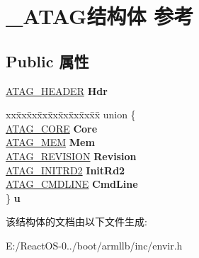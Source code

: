 \hypertarget{struct___a_t_a_g}{}\section{\+\_\+\+A\+T\+A\+G结构体 参考}
\label{struct___a_t_a_g}
\subsection*{Public 属性}
\begin{DoxyCompactItemize}
\item 
\mbox{\label{struct___a_t_a_g_ab2f69b82694a96cf59af987ccbd45232}} 
\hyperlink{struct___a_t_a_g___h_e_a_d_e_r}{A\+T\+A\+G\+\_\+\+H\+E\+A\+D\+ER} {\bfseries Hdr}
\item 
\mbox{\label{struct___a_t_a_g_a5dacf3bf3f31d931bba896833f119daf}} 
\begin{tabbing}
xx\=xx\=xx\=xx\=xx\=xx\=xx\=xx\=xx\=\kill
union \{\\
\>\hyperlink{struct___a_t_a_g___c_o_r_e}{ATAG\_CORE} {\bfseries Core}\\
\>\hyperlink{struct___a_t_a_g___m_e_m}{ATAG\_MEM} {\bfseries Mem}\\
\>\hyperlink{struct___a_t_a_g___r_e_v_i_s_i_o_n}{ATAG\_REVISION} {\bfseries Revision}\\
\>\hyperlink{struct___a_t_a_g___i_n_i_t_r_d2}{ATAG\_INITRD2} {\bfseries InitRd2}\\
\>\hyperlink{struct___a_t_a_g___c_m_d_l_i_n_e}{ATAG\_CMDLINE} {\bfseries CmdLine}\\
\} {\bfseries u}\\

\end{tabbing}\end{DoxyCompactItemize}


该结构体的文档由以下文件生成\+:\begin{DoxyCompactItemize}
\item 
E\+:/\+React\+O\+S-\/0../boot/armllb/inc/envir.\+h\end{DoxyCompactItemize}
